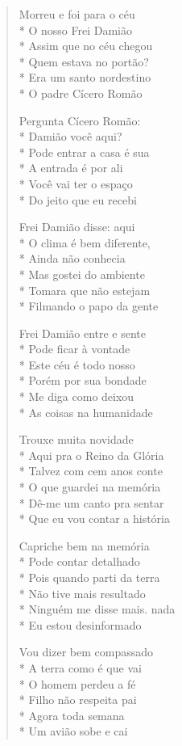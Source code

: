 \begin{verse}
Morreu e foi para o céu\\*
O nosso Frei Damião\\*
Assim que no céu chegou\\*
Quem estava no portão?\\*
Era um santo nordestino\\*
O padre Cícero Romão

Pergunta Cícero Romão:\\*
Damião você aqui?\\*
Pode entrar a casa é sua\\*
A entrada é por ali\\*
Você vai ter o espaço\\*
Do jeito que eu recebi

Frei Damião disse: aqui\\*
O clima é bem diferente,\\*
Ainda não conhecia\\*
Mas gostei do ambiente\\*
Tomara que não estejam\\*
Filmando o papo da gente

Frei Damião entre e sente\\*
Pode ficar à vontade\\*
Este céu é todo nosso\\*
Porém por sua bondade\\*
Me diga como deixou\\*
As coisas na humanidade

Trouxe muita novidade\\*
Aqui pra o Reino da Glória\\*
Talvez com cem anos conte\\*
O que guardei na memória\\*
Dê-me um canto pra sentar\\*
Que eu vou contar a história

Capriche bem na memória\\*
Pode contar detalhado\\*
Pois quando parti da terra\\*
Não tive mais resultado\\*
Ninguém me disse mais. nada\\*
Eu estou desinformado

Vou dizer bem compassado\\*
A terra como é que vai\\*
O homem perdeu a fé\\*
Filho não respeita pai\\*
Agora toda semana\\*
Um avião sobe e cai


\end{verse}
